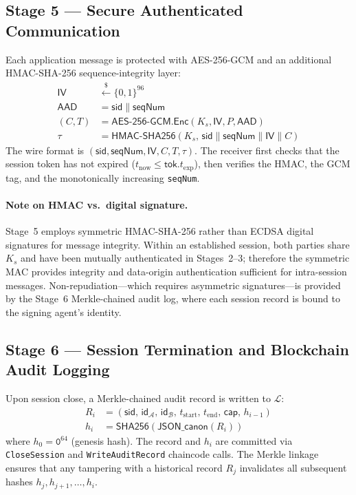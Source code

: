 \documentclass[review,5p,twocolumn,times]{elsarticle}
\begin{document}
\subsection{Stage 5 --- Secure Authenticated Communication}

Each application message is protected with AES-256-GCM and an additional
HMAC-SHA-256 sequence-integrity layer:
\begin{align}
\mathsf{IV}  &\xleftarrow{\$} \{0,1\}^{96}
\label{eq:iv}\\
\mathsf{AAD} &= \mathsf{sid} \| \mathsf{seqNum}
\label{eq:aad}\\
(C, T) &= \mathsf{AES\text{-}256\text{-}GCM.Enc}(K_s, \mathsf{IV}, P, \mathsf{AAD})
\label{eq:enc}\\
\tau   &= \mathsf{HMAC\text{-}SHA256}\!\left(K_s,\,
          \mathsf{sid}\|\mathsf{seqNum}\|\mathsf{IV}\|C\right)
\label{eq:hmac}
\end{align}
The wire format is
$(\mathsf{sid}, \mathsf{seqNum}, \mathsf{IV}, C, T, \tau)$.
The receiver first checks that the session token has not expired
($t_{\mathrm{now}} \leq \mathsf{tok}.t_{\mathrm{exp}}$), then verifies
the HMAC, the GCM tag, and the monotonically increasing \texttt{seqNum}.

\paragraph{Note on HMAC vs.\ digital signature.}
Stage~5 employs symmetric HMAC-SHA-256 rather than ECDSA digital signatures
for message integrity. Within an established session, both parties share
$K_s$ and have been mutually authenticated in Stages~2--3; therefore the
symmetric MAC provides integrity and data-origin authentication sufficient
for intra-session messages. Non-repudiation---which requires asymmetric
signatures---is provided by the Stage~6 Merkle-chained audit log,
where each session record is bound to the signing agent's identity.

\subsection{Stage 6 --- Session Termination and Blockchain Audit Logging}

Upon session close, a Merkle-chained audit record is written to $\mathcal{L}$:
\begin{align}
R_i &= (\mathsf{sid},\, \mathsf{id}_\mathcal{A},\, \mathsf{id}_\mathcal{B},\,
        t_{\mathrm{start}},\, t_{\mathrm{end}},\, \mathsf{cap},\, h_{i-1})
\label{eq:audit}\\
h_i &= \mathsf{SHA256}\!\left(\mathsf{JSON\_canon}(R_i)\right)
\label{eq:merkle}
\end{align}
where $h_0 = \mathtt{0}^{64}$ (genesis hash). The record and $h_i$ are
committed via \texttt{CloseSession} and \texttt{WriteAuditRecord} chaincode
calls. The Merkle linkage ensures that any tampering with a historical record
$R_j$ invalidates all subsequent hashes $h_{j},h_{j+1},\ldots,h_i$.
\end{document}
